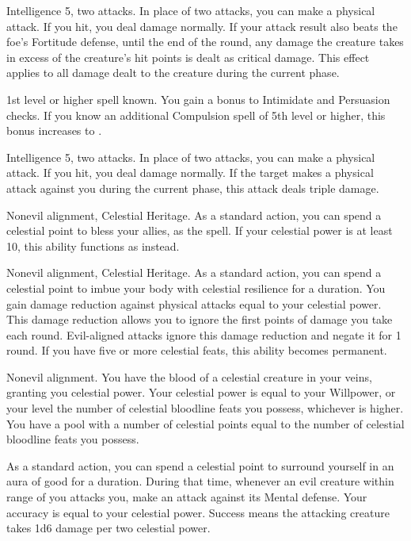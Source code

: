 \featpre Intelligence 5, two attacks.
\featben In place of two attacks, you can make a physical attack.
If you hit, you deal damage normally.
If your attack result also beats the foe's Fortitude defense, until the end of the round, any damage the creature takes in excess of the creature's hit points is dealt as critical damage.
This effect applies to all damage dealt to the creature during the current phase.

\featpre 1st level or higher  spell known.
\featben You gain a  bonus to Intimidate and Persuasion checks.
If you know an additional Compulsion spell of 5th level or higher, this bonus increases to .

\featpre Intelligence 5, two attacks.
\featben In place of two attacks, you can make a physical attack.
If you hit, you deal damage normally.
If the target makes a physical attack against you during the current phase, this attack deals triple damage.

\featpres
Nonevil alignment, Celestial Heritage.
\featben As a standard action, you can spend a celestial point to bless your allies, as the  spell.
If your celestial power is at least 10, this ability functions as  instead.

\featpres
Nonevil alignment, Celestial Heritage.
\featben As a standard action, you can spend a celestial point to imbue your body with celestial resilience for a \durshort duration.
You gain damage reduction against physical attacks equal to your celestial power.
This damage reduction allows you to ignore the first points of damage you take each round.
Evil-aligned attacks ignore this damage reduction and negate it for 1 round.
If you have five or more celestial feats, this ability becomes permanent.

\featpre Nonevil alignment.
\featben You have the blood of a celestial creature in your veins, granting you celestial power.
Your celestial power is equal to your Willpower, or your level \add the number of celestial bloodline feats you possess, whichever is higher.
You have a pool with a number of celestial points equal to the number of celestial bloodline feats you possess.

As a standard action, you can spend a celestial point to surround yourself in an aura of good for a \durshort duration.
During that time, whenever an evil creature within \rngclose range of you attacks you, make an attack against its Mental defense.
Your accuracy is equal to your celestial power.
Success means the attacking creature takes 1d6 damage per two celestial power.

